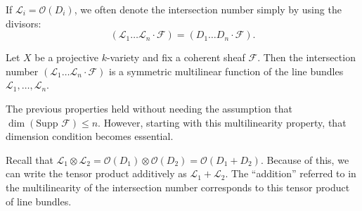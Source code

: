 \begin{definition}[Notation]
If $\mathcal{L}_i = \mathcal{O}(D_i)$, we often denote the intersection number simply by using the divisors:
\[
(\mathcal{L}_1 \dots \mathcal{L}_n \cdot \mathcal{F}) = (D_1 \dots D_n \cdot \mathcal{F}).
\]
\end{definition}

\begin{proposition}[20.1.3]
Let $X$ be a projective $k$-variety and fix a coherent sheaf $\mathcal{F}$. Then the intersection number $(\mathcal{L}_1 \dots \mathcal{L}_n \cdot \mathcal{F})$ is a symmetric multilinear function of the line bundles $\mathcal{L}_1, \dots, \mathcal{L}_n$.
\end{proposition}

\begin{remark}
The previous properties held without needing the assumption that $\dim(\text{Supp } \mathcal{F}) \leq n$. However, starting with this multilinearity property, that dimension condition becomes essential.
\end{remark}

\begin{remark}
Recall that $\mathcal{L}_1 \otimes \mathcal{L}_2 = \mathcal{O}(D_1) \otimes \mathcal{O}(D_2) = \mathcal{O}(D_1 + D_2)$. Because of this, we can write the tensor product additively as $\mathcal{L}_1 + \mathcal{L}_2$. The ``addition'' referred to in the multilinearity of the intersection number corresponds to this tensor product of line bundles.
\end{remark}

